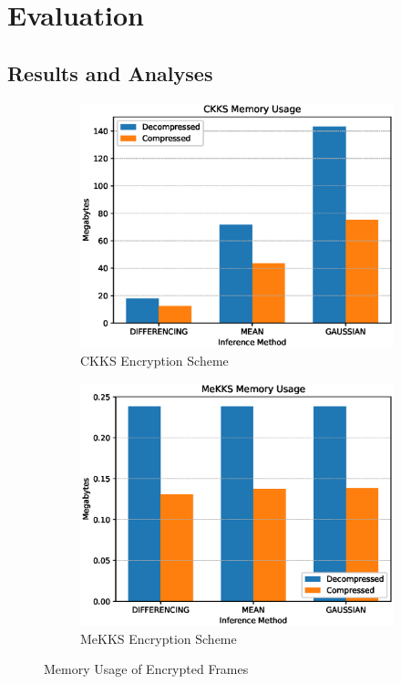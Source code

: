 \chapter{Evaluation}
\label{chap:evaluation}

\section{Results and Analyses}

\begin{figure}[h]
    \centering
    \begin{subfigure}[b]{0.45\textwidth}
        \centering
        \includegraphics[width=\textwidth]{figures/memUsageCKKS.eps}
        \caption{CKKS Encryption Scheme}
        \label{fig:CKKS Memory Usage}
    \end{subfigure}
    \hfill
    \begin{subfigure}[b]{0.45\textwidth}
        \centering
        \includegraphics[width=\textwidth]{figures/memUsageMeKKS.eps}
        \caption{MeKKS Encryption Scheme}
        \label{fig:MeKKS Memory Usage}
    \end{subfigure}
    \caption{Memory Usage of Encrypted Frames}
    \label{fig:Memory Usage}
\end{figure}


